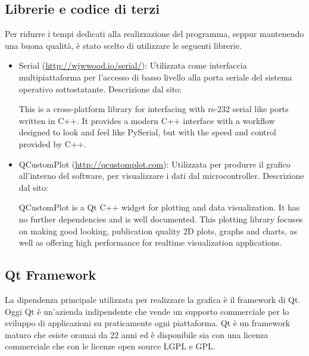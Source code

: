 \subsection{Librerie e codice di terzi}
Per ridurre i tempi dedicati alla realizzazione del programma, seppur
mantenendo una buona qualit\`a, \`e stato scelto di utilizzare le seguenti
librerie.

\begin{itemize}
    \item Serial (\url{http://wjwwood.io/serial/}): Utilizzata come
        interfaccia multipiattaforma per l'accesso di basso livello alla porta
        seriale del sistema operativo sottostatante. Descrizione dal sito:
        \begin{displayquote}
            This is a cross-platform library for interfacing with rs-232
            serial like ports written in C++. It provides a modern C++
            interface with a workflow designed to look and feel like PySerial,
            but with the speed and control provided by C++. 
        \end{displayquote}

    \item QCustomPlot (\url{http://qcustomplot.com}): Utilizzata per produrre
        il grafico all'interno del software, per visualizzare i dati dal
        microcontroller. Descrizione dal sito:
        \begin{displayquote}
            QCustomPlot is a Qt C++ widget for plotting and data
            visualization. It has no further dependencies and is well
            documented. This plotting library focuses on making good looking,
            publication quality 2D plots, graphs and charts, as well as
            offering high performance for realtime visualization applications. 
        \end{displayquote}
\end{itemize}

\subsection{Qt Framework}
La dipendenza principale utilizzata per realizzare la grafica \`e il framework
di Qt. Oggi Qt \`e un'azienda indipendente che vende un supporto commerciale
per lo sviluppo di applicazioni su praticamente ogni piattaforma.
Qt \`e un framework maturo che esiste oramai da 22 anni ed \`e disponibile sia
con una licenza commerciale che con le licenze open source LGPL e GPL.

